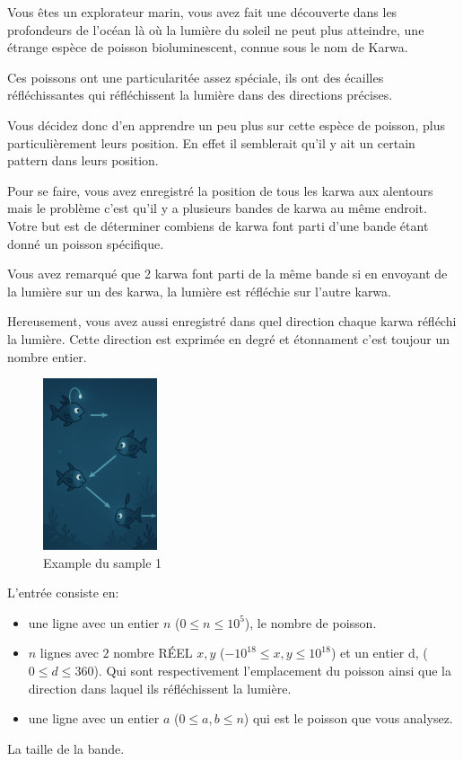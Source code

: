 \problemname{}



Vous êtes un explorateur marin, vous avez fait une découverte dans les profondeurs de l'océan là où la lumière du soleil ne peut plus atteindre, une étrange espèce de poisson bioluminescent, connue sous le nom de Karwa.

Ces poissons ont une particularitée assez spéciale, ils ont des écailles réfléchissantes qui réfléchissent la lumière dans des directions précises.

Vous décidez donc d'en apprendre un peu plus sur cette espèce de poisson, plus particulièrement leurs position. En effet il semblerait qu'il y ait un certain pattern dans leurs position.

Pour se faire, vous avez enregistré la position de tous les karwa aux alentours mais le problème c'est qu'il y a plusieurs bandes de karwa au même endroit. Votre but est de déterminer combiens de karwa font parti d'une bande étant donné un poisson spécifique.

Vous avez remarqué que 2 karwa font parti de la même bande si en envoyant de la lumière sur un des karwa, la lumière est réfléchie sur l'autre karwa.

Hereusement, vous avez aussi enregistré dans quel direction chaque karwa réfléchi la lumière. Cette direction est exprimée en degré et étonnament c'est toujour un nombre entier.

\smallskip
\begin{figure}[h]
    \centering
    \includegraphics[width=0.3\textwidth]{sample1.png}
    \caption{Example du sample 1}
\end{figure}

\begin{Input}
    L'entrée consiste en:
    \begin{itemize}
        \item une ligne avec un entier $n$ ($0\leq n\leq 10^{5}$), le nombre de poisson.
        \item $n$ lignes avec $2$ nombre RÉEL $x, y$ ($-10^{18} \leq x,y \leq {10^{18}}$) et un entier d, ($0 \leq d \leq 360$). Qui sont respectivement l'emplacement du poisson ainsi que la direction dans laquel ils réfléchissent la lumière.
        \item une ligne avec un entier $a$ ($0 \leq a, b \leq n$) qui est le poisson que vous analysez.
    \end{itemize}
\end{Input}

\begin{Output}
    La taille de la bande.
\end{Output}
